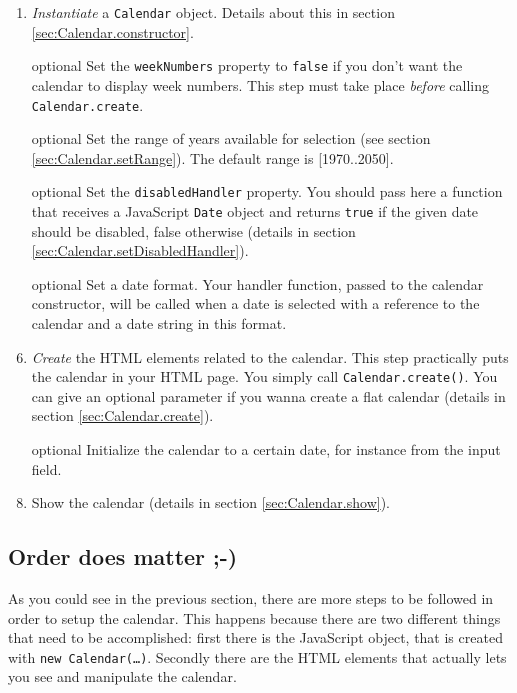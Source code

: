 \documentclass[a4paper,10pt]{article}
\begin{document}
\begin{enumerate}

\item \emph{Instantiate} a \texttt{Calendar} object.  Details about this in
section \ref{sec:Calendar.constructor}.

\item [optional] Set the \texttt{weekNumbers} property to \texttt{false} if you don't want
the calendar to display week numbers.  This step must take place \emph{before}
calling \texttt{Calendar.create}.

\item [optional] Set the range of years available for selection (see section
\ref{sec:Calendar.setRange}).  The default range is [1970..2050].

\item [optional] Set the \texttt{disabledHandler} property.  You should pass
here a function that receives a JavaScript \texttt{Date} object and returns
\texttt{true} if the given date should be disabled, false otherwise (details in
section \ref{sec:Calendar.setDisabledHandler}).

\item [optional] Set a date format.  Your handler function, passed to the
calendar constructor, will be called when a date is selected with a reference
to the calendar and a date string in this format.

\item \emph{Create} the HTML elements related to the calendar.  This step
practically puts the calendar in your HTML page.  You simply call
\texttt{Calendar.create()}.  You can give an optional parameter if you wanna
create a flat calendar (details in section \ref{sec:Calendar.create}).

\item [optional] Initialize the calendar to a certain date, for instance from
the input field.

\item Show the calendar (details in section \ref{sec:Calendar.show}).

\end{enumerate}

\subsection{Order does matter ;-)}

As you could see in the previous section, there are more steps to be followed
in order to setup the calendar.  This happens because there are two different
things that need to be accomplished: first there is the JavaScript object, that
is created with \texttt{new Calendar(\ldots)}.  Secondly there are the HTML
elements that actually lets you see and manipulate the calendar.
\end{document}
